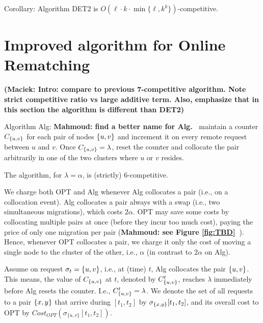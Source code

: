 \documentclass[manuscript,screen=true, review, anonymous]{acmart}
\DeclarePairedDelimiter\set{\{}{\}}
\newcommand\mahmoud[1]{\color{orange}\textbf{Mahmoud: #1~}\color{black}}
\newcommand\maciek[1]{\color{brown}\textbf{(Maciek: #1)}\color{black}}
\begin{document}
Corollary: Algorithm DET2 is $O(\ell \cdot k \cdot \min \{ \ell, k^k \})$-competitive.



\section{Improved algorithm for Online Rematching}
\label{sec:k2}



\maciek{Intro: compare to previous 7-competitive algorithm. Note strict competitive ratio vs large additive term. Also, emphasize that in this section the algorithm is different than DET2}

Algorithm Alg:
\mahmoud{find a better name for Alg.}
maintain a counter $C_{\set{u,v}}$ for each pair of nodes $\set{u,v}$ and increment it on every remote request between $u$ and $v$.
Once $C_{\set{u,v}} = \lambda$,
reset the counter and collocate the pair arbitrarily in one of the two clusters where $u$ or $v$ resides.

\begin{theorem} \label{thm:k=2}
	The algorithm, for $\lambda=\alpha$, is (strictly) 6-competitive.
\end{theorem}


We charge both OPT and Alg whenever Alg collocates a pair (i.e., on a collocation event).
Alg collocates a pair always with a swap (i.e., two simultaneous migrations),
which  costs $2\alpha$.
OPT may save some costs by collocating multiple pairs at once (before they incur too much cost),
paying the price of only one migration per pair  (\mahmoud{see Figure \ref{fig:TBD}}).
Hence,
whenever OPT collocates a pair,
we charge it only the cost of moving a single node to the cluster of the other,
i.e., $\alpha$ (in contrast to $2\alpha$ on Alg).

Assume on request $\sigma_{t}=\set{u,v}$, 
i.e., at (time) $t$,
Alg collocates the pair $\set{u,v}$.
This means,
the value of $C_{\set{u,v}}$ at $t$,
denoted by $C^t_{\set{u,v}}$, 
reaches $\lambda$ immediately before Alg resets the counter.
I.e.,
$ C^t_{\set{u,v}} = \lambda$.
We denote the set of all requests to a pair $\set{x,y}$ that arrive
during $[t_1,t_2]$ by $\sigma_{\set{x,y}}[t_1,t_2]$,
and its overall cost to OPT by
$\mathit{Cost}_{\mathit{OPT}} (\sigma_{\{u,v\}}[t_1,t_2])$.
%
\end{document}
